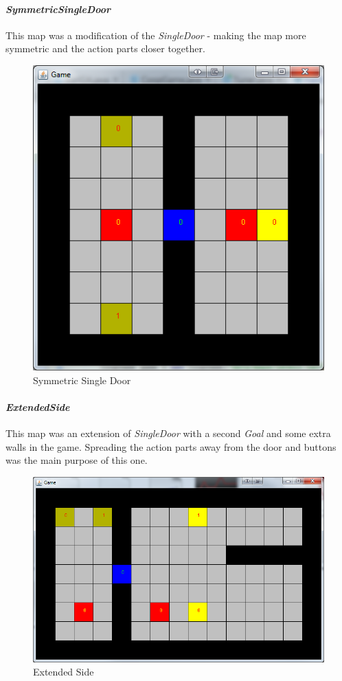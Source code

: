 \documentclass{IEEEtran}
\begin{document}
\paragraph{\emph{SymmetricSingleDoor}} This map was a modification of the \emph{SingleDoor} - making the map more symmetric and the action parts closer together.
\begin{figure}[H]
\centering
\includegraphics[scale=0.35]{level2}
\caption{Symmetric Single Door}
\label{SymmetricSingleDoor}
\end{figure}
\paragraph{\emph{ExtendedSide}} This map was an extension of \emph{SingleDoor} with a second \emph{Goal} and some extra walls in the game. Spreading the action parts away from the door and buttons was the main purpose of this one.
\begin{figure}[H]
\centering
\includegraphics[scale=0.35]{level3}
\caption{Extended Side}
\label{ExtendedSide}
\end{figure}
\end{document}
